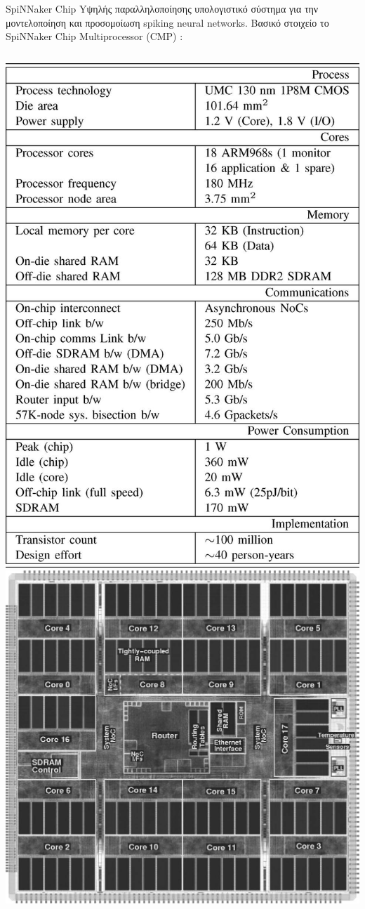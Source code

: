 \documentclass[11pt,center]{beamer}
\begin{document}
\begin{frame}{SpiNNaker Chip}
  Yψηλής παραλληλοποίησης υπολογιστικό σύστημα για την μοντελοποίηση και προσομοίωση spiking 				neural networks.
  \pause
  \vfill
  Βασικό στοιχείο το SpiNNaker Chip Multiprocessor (CMP) \tiny{\cite{spinnaker}}:
  \vfill
  \begin{columns}
	\includegraphics[width=0.75 \textwidth,right]{../pics/CMPspecs.jpg}
	\includegraphics[width=0.75 \textwidth,left]{../pics/CMP.jpg}
  \end{columns}
\end{frame}
\end{document}
